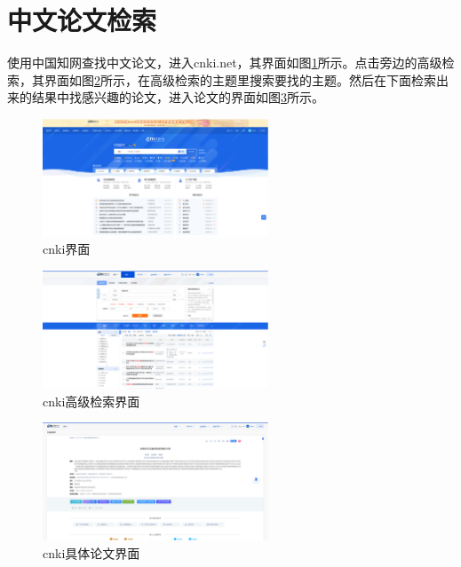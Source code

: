 \section{中文论文检索}

使用中国知网查找中文论文，进入cnki.net，其界面如图\ref{the_Cnki}所示。点击旁边的高级检索，其界面如图\ref{cnki_adv_s}所示，在高级检索的主题里搜索要找的主题。然后在下面检索出来的结果中找感兴趣的论文，进入论文的界面如图\ref{the_Cnki_paper}所示。

    \begin{figure}[H]
        \centering
        \includegraphics[width=0.6\textwidth]{./asserts/the_cnki.png}
        \caption{cnki界面}
        \label{the_Cnki}
    \end{figure}

    \begin{figure}[H]
        \centering
        \includegraphics[width=0.6\textwidth]{./asserts/the_cnki_adv_search.png}
        \caption{cnki高级检索界面}
        \label{cnki_adv_s}
    \end{figure}

    \begin{figure}[H]
        \centering
        \includegraphics[width=0.6\textwidth]{./asserts/cnki_find_paper.png}
        \caption{cnki具体论文界面}
        \label{the_Cnki_paper}
    \end{figure}
